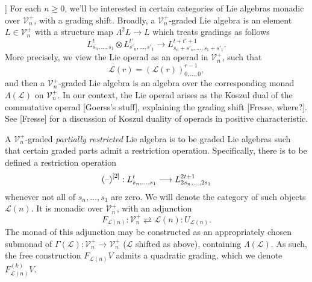 \documentclass[11pt]{amsart}
\theoremstyle{plain}
\theoremstyle{definition}
\DeclareMathOperator{\im}{im}
\newcommand{\DASH}{\textup{--}}
\renewcommand{\to}{\longrightarrow}
\newcommand{\scrL}{\mathscr{L}}
\newcommand{\calL}{\mathcal{L}}
\newcommand{\calV}{\mathcal{V}}
\theoremstyle{plain}
\newcommand{\LieOperad}{{\scrL}}
\newcommand{\restn}[1]{{#1}^{[2]}}
\newcommand{\vect}[2]{\calV^{#1}_{#2}}
\begin{document}
\begin{Lie algebras in characteristic 2 and their homotopy operations}
]%
For each $n\geq0$, we'll be interested in certain categories of Lie algebras monadic over $\vect{+}{n}$, with a grading shift. Broadly, a $\vect{+}{n}$-graded Lie algebra is an element $L\in\vect{+}{n}$ with a structure map $\Lambda^2 L\to L$ which treats gradings as follows
\[L^{t}_{s_n,\ldots,s_1}\otimes L^{t'}_{s'_n,\ldots,s'_1}\to L^{t+t'+1}_{s_n+s'_n,\ldots,s_1+s'_1}.\]
More precisely, we view the Lie operad as an operad in $\vect{+}{n}$, such that
\[\LieOperad(r)=(\LieOperad(r))^{r-1}_{0,\ldots,0},\]
and then a $\vect{+}{n}$-graded Lie algebra is an algebra over the corresponding monad $\Lambda(\LieOperad)$ on $\vect{+}{n}$. In our context, the Lie operad arises as the Koszul dual of the commutative operad [Goerss's stuff], explaining the grading shift [Fresse, where?]. See [Fresse] for a discussion of Koszul duality of operads in positive characteristic.

A $\vect{+}{n}$-graded \emph{partially restricted} Lie algebra is to be graded Lie algebras such that certain graded parts admit a restriction operation. Specifically, there is to be defined a restriction operation
\[\restn{(\DASH)}:L^t_{s_n,\ldots,s_1}\to L^{2t+1}_{2s_n,\ldots,2s_1}\]
whenever not all of $s_n,\ldots,s_{1}$ are zero. We will denote the category of such objects $\calL(n)$. It is monadic over $\vect{+}{n}$, with an adjunction
\[F_{\calL(n)}:\vect{+}{n}\rightleftarrows \calL(n):U_{\calL(n)}.\]
The monad of this adjunction may be constructed as an appropriately chosen submonad of $\Gamma(\LieOperad):\vect{+}{n}\to \vect{+}{n}$ ($\LieOperad$ shifted as above), containing $\Lambda(\LieOperad)$. As such, the free construction $F_{\calL(n)}V$ admits a quadratic grading, which we denote $F_{\calL(n)}^{(k)}V$.


\end{Lie algebras in characteristic 2 and their homotopy operations}
\end{document}
